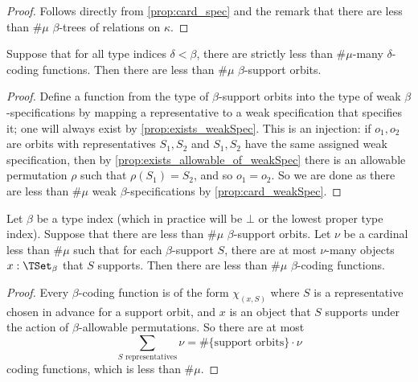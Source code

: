\begin{proof}
  Follows directly from \cref{prop:card_spec} and the remark that there are less than \( \#\mu \) \( \beta \)-trees of relations on \( \kappa \).
\end{proof}
\begin{proposition}
  \label{prop:card_supportOrbit}
  Suppose that for all type indices \( \delta < \beta \), there are strictly less than \( \#\mu \)-many \( \delta \)-coding functions.
  Then there are less than \( \#\mu \) \( \beta \)-support orbits.
\end{proposition}
\begin{proof}
  Define a function from the type of \( \beta \)-support orbits into the type of weak \( \beta \)-specifications by mapping a representative to a weak specification that specifies it; one will always exist by \cref{prop:exists_weakSpec}.
  This is an injection: if \( o_1, o_2 \) are orbits with representatives \( S_1, S_2 \) and \( S_1, S_2 \) have the same assigned weak specification, then by \cref{prop:exists_allowable_of_weakSpec} there is an allowable permutation \( \rho \) such that \( \rho(S_1) = S_2 \), and so \( o_1 = o_2 \).
  So we are done as there are less than \( \#\mu \) weak \( \beta \)-specifications by \cref{prop:card_weakSpec}.
\end{proof}
\begin{proposition}
  \label{prop:card_codingFunction_of_card_supports}
  Let \( \beta \) be a type index (which in practice will be \( \bot \) or the lowest proper type index).
  Suppose that there are less than \( \#\mu \) \( \beta \)-support orbits.
  Let \( \nu \) be a cardinal less than \( \#\mu \) such that for each \( \beta \)-support \( S \), there are at most \( \nu \)-many objects \( x : \TSet_\beta \) that \( S \) supports.
  Then there are less than \( \#\mu \) \( \beta \)-coding functions.
\end{proposition}
\begin{proof}
  Every \( \beta \)-coding function is of the form \( \chi_{(x, S)} \) where \( S \) is a representative chosen in advance for a support orbit, and \( x \) is an object that \( S \) supports under the action of \( \beta \)-allowable permutations.
  So there are at most
  \[ \sum_{S \text{ representatives}} \nu = \#\{\text{support orbits}\} \cdot \nu \]
  coding functions, which is less than \( \#\mu \).
\end{proof}
